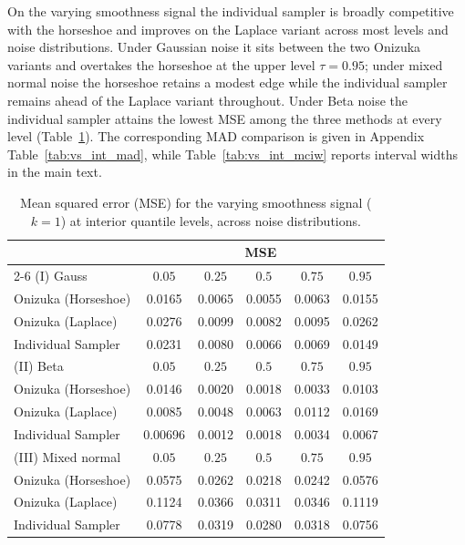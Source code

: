 On the varying smoothness signal the individual sampler is broadly competitive with the horseshoe and improves on the Laplace variant across most levels and noise distributions. Under Gaussian noise it sits between the two Onizuka variants and overtakes the horseshoe at the upper level $\tau = 0.95$; under mixed normal noise the horseshoe retains a modest edge while the individual sampler remains ahead of the Laplace variant throughout. Under Beta noise the individual sampler attains the lowest MSE among the three methods at every level (Table~\ref{tab:vs_int_mse}). The corresponding MAD comparison is given in Appendix Table~\ref{tab:vs_int_mad}, while Table~\ref{tab:vs_int_mciw} reports interval widths in the main text.
\begin{table}[htbp]
\centering
\caption{Mean squared error (MSE) for the varying smoothness signal ($k=1$) at interior quantile levels, across noise distributions.}
\label{tab:vs_int_mse}
\begin{tabular}{lccccc}
\toprule
& \multicolumn{5}{c}{MSE} \\
\cmidrule(lr){2-6}
(I) Gauss & $0.05$ & $0.25$ & $0.5$ & $0.75$ & $0.95$ \\
\midrule
Onizuka (Horseshoe) & 0.0165 & 0.0065 & 0.0055 & 0.0063 & 0.0155 \\
Onizuka (Laplace)   & 0.0276 & 0.0099 & 0.0082 & 0.0095 & 0.0262 \\
Individual Sampler  & 0.0231 & 0.0080 & 0.0066 & 0.0069 & 0.0149 \\
\midrule
(II) Beta & $0.05$ & $0.25$ & $0.5$ & $0.75$ & $0.95$ \\
\midrule
Onizuka (Horseshoe) & 0.0146 & 0.0020 & 0.0018 & 0.0033 & 0.0103 \\
Onizuka (Laplace)   & 0.0085 & 0.0048 & 0.0063 & 0.0112 & 0.0169 \\
Individual Sampler  & 0.00696 & 0.0012 & 0.0018 & 0.0034 & 0.0067 \\
\midrule
(III) Mixed normal & $0.05$ & $0.25$ & $0.5$ & $0.75$ & $0.95$ \\
\midrule
Onizuka (Horseshoe) & 0.0575 & 0.0262 & 0.0218 & 0.0242 & 0.0576 \\
Onizuka (Laplace)   & 0.1124 & 0.0366 & 0.0311 & 0.0346 & 0.1119 \\
Individual Sampler  & 0.0778 & 0.0319 & 0.0280 & 0.0318 & 0.0756 \\
\bottomrule
\end{tabular}
\end{table}

